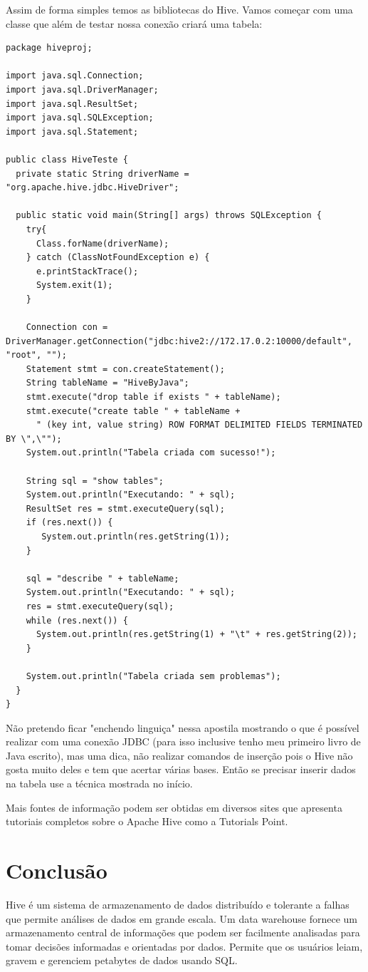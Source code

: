 \documentclass[a4paper,11pt]{article}
\begin{document}
Assim de forma simples temos as bibliotecas do Hive. Vamos começar com uma classe que além de testar nossa conexão criará uma tabela:
\begin{lstlisting}[]
package hiveproj;

import java.sql.Connection;
import java.sql.DriverManager;
import java.sql.ResultSet;
import java.sql.SQLException;
import java.sql.Statement;

public class HiveTeste {
  private static String driverName = "org.apache.hive.jdbc.HiveDriver";

  public static void main(String[] args) throws SQLException {
    try{
      Class.forName(driverName);
    } catch (ClassNotFoundException e) {
      e.printStackTrace();
      System.exit(1);
    }

    Connection con = DriverManager.getConnection("jdbc:hive2://172.17.0.2:10000/default", "root", "");
    Statement stmt = con.createStatement();
    String tableName = "HiveByJava";
    stmt.execute("drop table if exists " + tableName);
    stmt.execute("create table " + tableName +
      " (key int, value string) ROW FORMAT DELIMITED FIELDS TERMINATED BY \",\"");
    System.out.println("Tabela criada com sucesso!");

    String sql = "show tables";
    System.out.println("Executando: " + sql);
    ResultSet res = stmt.executeQuery(sql);
    if (res.next()) {
       System.out.println(res.getString(1));
    }

    sql = "describe " + tableName;
    System.out.println("Executando: " + sql);
    res = stmt.executeQuery(sql);
    while (res.next()) {
      System.out.println(res.getString(1) + "\t" + res.getString(2));
    }

    System.out.println("Tabela criada sem problemas");
  }
}
\end{lstlisting}

Não pretendo ficar "enchendo linguiça" nessa apostila mostrando o que é possível realizar com uma conexão JDBC (para isso inclusive tenho meu primeiro livro de Java escrito), mas uma dica, não realizar comandos de inserção pois o Hive não gosta muito deles e tem que acertar várias bases. Então se precisar inserir dados na tabela use a técnica mostrada no início.

Mais fontes de informação podem ser obtidas em diversos sites que apresenta tutoriais completos sobre o Apache Hive como a Tutorials Point\cite{tutorialspoint}.
	
\section{Conclusão}
Hive é um sistema de armazenamento de dados distribuído e tolerante a falhas que permite análises de dados em grande escala. Um data warehouse fornece um armazenamento central de informações que podem ser facilmente analisadas para tomar decisões informadas e orientadas por dados. Permite que os usuários leiam, gravem e gerenciem petabytes de dados usando SQL. 
\end{document}

